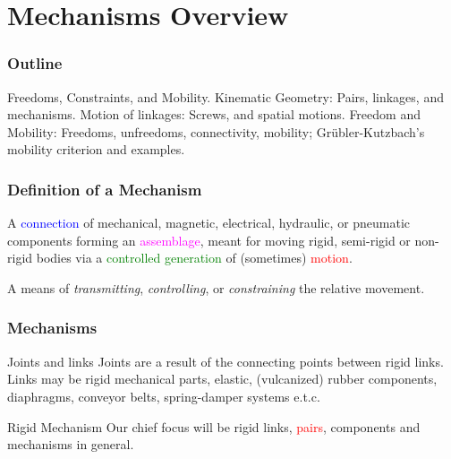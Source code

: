\section{Mechanisms Overview}

\begin{frame}
	\frametitle{Outline}
	\begin{tcolorbox}[coltitle=yellow!50!black,colframe=magenta!25,split=.2,title=Mechanism Components]
		Freedoms, Constraints, and Mobility.
		\tcblower
		 Kinematic Geometry: Pairs, linkages, and mechanisms.
		 \vspace{.2cm}
		\newline
		Motion of linkages: Screws, and spatial motions.
		\vspace{.2cm}
		\newline
		Freedom and Mobility: Freedoms, unfreedoms, connectivity, mobility;
		\vspace{.2cm}
		\newline
		Gr{\"u}bler-Kutzbach's mobility criterion and examples.
	\end{tcolorbox}
\end{frame}
 
\begin{frame}
	\frametitle{Definition of a Mechanism}
		\begin{definition}
			A \textcolor{blue}{connection} of  mechanical, magnetic, electrical, hydraulic, or pneumatic components forming an \textcolor{magenta}{assemblage}, meant for moving rigid, semi-rigid or non-rigid bodies via a \textcolor{green}{controlled generation} of (sometimes) \textcolor{red}{motion}.
		\end{definition}
	\begin{tcolorbox}[coltitle=red!80!black,colframe=magenta!25,title=Kenneth Hunt (1978)]
			A means of \textit{transmitting}, \textit{controlling}, or \textit{constraining} the relative movement.
	\end{tcolorbox}
\end{frame}

\begin{frame}
	\frametitle{Mechanisms}
	\begin{block}{Joints and links}
		Joints are a result of the connecting points between rigid links.
		Links may be rigid mechanical parts, elastic, (vulcanized) rubber components, diaphragms, conveyor belts, spring-damper systems e.t.c.
	\end{block}
	\begin{block}{Rigid Mechanism}
		Our chief focus will be rigid links, \textcolor{red}{pairs}, components and mechanisms in general.
	\end{block}
\end{frame}



